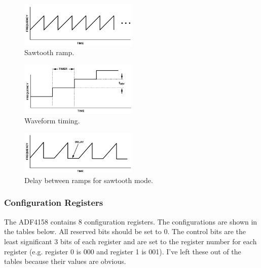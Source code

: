 \begin{figure}[h]
        \centering
        \includegraphics[width=0.5\textwidth]{data/adf4158-sawtooth-ramp.png}
        \caption{Sawtooth ramp.}
        \label{fig:adf4158-sawtooth-ramp}\end{figure}

\begin{figure}[h]
        \centering
        \includegraphics[width=0.5\textwidth]{data/adf4158-waveform-timing.png}
        \caption{Waveform timing.}
        \label{fig:adf4158-waveform-timing}
\end{figure}

\begin{figure}[h]
        \centering
        \includegraphics[width=0.5\textwidth]{data/adf4158-delay.png}
        \caption{Delay between ramps for sawtooth mode.}
        \label{fig:adf4158-delay}
\end{figure}

\subsubsection{Configuration Registers}
\label{sec:adf4158-config-regs}

The ADF4158 contains 8 configuration registers. The configurations are shown in the tables
below. All reserved bits should be set to 0. The control bits are the least significant 3 bits of
each register and are set to the register number for each register (e.g. register 0 is 000 and
register 1 is 001). I've left these out of the tables because their values are obvious.

